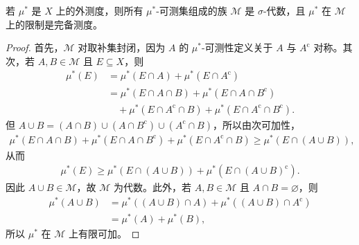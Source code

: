 \documentclass[../../main.tex]{subfiles}%
\begin{document}
\begin{theorem}[Carathéodory 定理]\label{theorem:ch01-caratheodory}
若 $\mu^*$ 是 $X$ 上的外测度，则所有 $\mu^*$-可测集组成的族 $\mathscr{M}$ 是 $\sigma$-代数，且 $\mu^*$ 在 $\mathscr{M}$ 上的限制是完备测度。
\end{theorem}

\begin{proof}
首先，$\mathscr{M}$ 对取补集封闭，因为 $A$ 的 $\mu^*$-可测性定义关于 $A$ 与 $A^{\mathrm{c}}$ 对称。其次，若 $A,B\in\mathscr{M}$ 且 $E\subseteq X$，则
\begin{align*}
\mu^*(E)&=\mu^*(E\cap A)+\mu^*(E\cap A^{\mathrm{c}})\\
&=\mu^*(E\cap A\cap B)+\mu^*(E\cap A\cap B^{\mathrm{c}})\\
&\quad+\mu^*(E\cap A^{\mathrm{c}}\cap B)+\mu^*(E\cap A^{\mathrm{c}}\cap B^{\mathrm{c}}).
\end{align*}
但 $A\cup B=(A\cap B)\cup(A\cap B^{\mathrm{c}})\cup(A^{\mathrm{c}}\cap B)$，所以由次可加性，
\begin{align*}
\mu^*(E\cap A\cap B)+\mu^*(E\cap A\cap B^{\mathrm{c}})+\mu^*(E\cap A^{\mathrm{c}}\cap B)\geqslant\mu^*(E\cap(A\cup B)),
\end{align*}
从而
\begin{align*}
\mu^*(E)\geqslant\mu^*(E\cap(A\cup B))+\mu^*(E\cap(A\cup B)^{\mathrm{c}}).
\end{align*}
因此 $A\cup B\in\mathscr{M}$，故 $\mathscr{M}$ 为代数。此外，若 $A,B\in\mathscr{M}$ 且 $A\cap B=\varnothing$，则
\begin{align*}
\mu^*(A\cup B)&=\mu^*((A\cup B)\cap A)+\mu^*((A\cup B)\cap A^{\mathrm{c}})\\
&=\mu^*(A)+\mu^*(B),
\end{align*}
所以 $\mu^*$ 在 $\mathscr{M}$ 上有限可加。


\end{proof}
\end{document}

